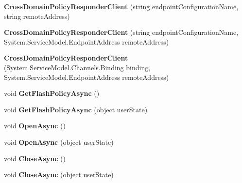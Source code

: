 \begin{DoxyCompactItemize}
\item 
\hypertarget{class_cross_domain_policy_responder_client_a6d7837d62f46c79003208caf6c9e4277}{
{\bfseries CrossDomainPolicyResponderClient} (string endpointConfigurationName, string remoteAddress)}
\label{class_cross_domain_policy_responder_client_a6d7837d62f46c79003208caf6c9e4277}

\item 
\hypertarget{class_cross_domain_policy_responder_client_a736bba2a16e80787c7297484d6f9ddba}{
{\bfseries CrossDomainPolicyResponderClient} (string endpointConfigurationName, System.ServiceModel.EndpointAddress remoteAddress)}
\label{class_cross_domain_policy_responder_client_a736bba2a16e80787c7297484d6f9ddba}

\item 
\hypertarget{class_cross_domain_policy_responder_client_a8597cad92f66c9a1621fbb1d77f488fa}{
{\bfseries CrossDomainPolicyResponderClient} (System.ServiceModel.Channels.Binding binding, System.ServiceModel.EndpointAddress remoteAddress)}
\label{class_cross_domain_policy_responder_client_a8597cad92f66c9a1621fbb1d77f488fa}

\item 
\hypertarget{class_cross_domain_policy_responder_client_a50b916f19939c792d8720c460117b746}{
void {\bfseries GetFlashPolicyAsync} ()}
\label{class_cross_domain_policy_responder_client_a50b916f19939c792d8720c460117b746}

\item 
\hypertarget{class_cross_domain_policy_responder_client_a4c07ab986ee8a200d441434c1fb81cfa}{
void {\bfseries GetFlashPolicyAsync} (object userState)}
\label{class_cross_domain_policy_responder_client_a4c07ab986ee8a200d441434c1fb81cfa}

\item 
\hypertarget{class_cross_domain_policy_responder_client_a9e5c1d1298125952ed3b99aa402c5af5}{
void {\bfseries OpenAsync} ()}
\label{class_cross_domain_policy_responder_client_a9e5c1d1298125952ed3b99aa402c5af5}

\item 
\hypertarget{class_cross_domain_policy_responder_client_ae89e8766c64ccc9a78707686f65c4af5}{
void {\bfseries OpenAsync} (object userState)}
\label{class_cross_domain_policy_responder_client_ae89e8766c64ccc9a78707686f65c4af5}

\item 
\hypertarget{class_cross_domain_policy_responder_client_ab15a4cca0d395c15bd0f2c29b620a4db}{
void {\bfseries CloseAsync} ()}
\label{class_cross_domain_policy_responder_client_ab15a4cca0d395c15bd0f2c29b620a4db}

\item 
\hypertarget{class_cross_domain_policy_responder_client_a0198562d78b04ec1f5590dd27a3e4943}{
void {\bfseries CloseAsync} (object userState)}
\label{class_cross_domain_policy_responder_client_a0198562d78b04ec1f5590dd27a3e4943}

\end{DoxyCompactItemize}
